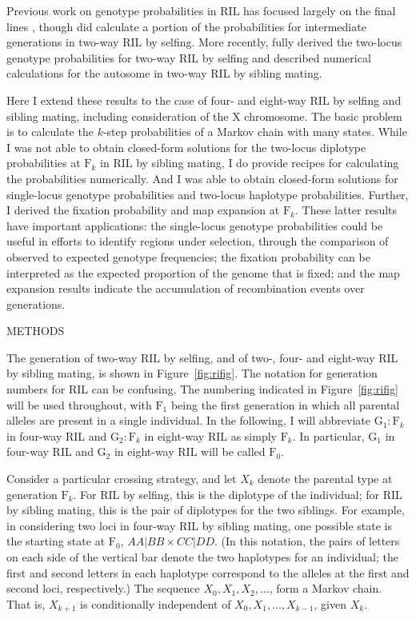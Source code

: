 \documentclass[12pt,letterpaper]{article}
\begin{document}
Previous work on genotype probabilities in RIL has focused largely on
the final lines \citep{Haldane1931, Broman2005, Teuscher2007}, though
\citet{Haldane1931} did calculate a portion of the probabilities for
intermediate generations in two-way RIL by selfing.  More recently, 
\citet{Johannes2011} fully derived the two-locus genotype
probabilities for two-way RIL by selfing and described numerical
calculations for the autosome in two-way RIL by sibling mating.

Here I extend these results to the case of four- and eight-way RIL by selfing
and sibling mating, including consideration of the X chromosome.  
The basic problem is to calculate the $k$-step probabilities of a
Markov chain with many states.  
While I was not able to obtain closed-form solutions for the
two-locus diplotype probabilities at $\text{F}_k$ in
RIL by sibling mating, I do
provide recipes for calculating the probabilities numerically.  
And I was able to obtain closed-form solutions for single-locus
genotype probabilities and two-locus haplotype probabilities.
Further, I derived the fixation probability and map expansion 
at $\text{F}_k$.  These latter results have important applications: the
single-locus genotype probabilities could be useful in efforts to
identify regions under selection, through the comparison of
observed to expected genotype frequencies; the fixation probability can be 
interpreted as the expected proportion of the genome that is fixed;
and the map expansion results indicate the accumulation of
recombination events over generations.


\clearpage
\centerline{METHODS}

The generation of two-way RIL by
selfing, and of two-, four- and eight-way RIL by sibling mating, is
shown in Figure~\ref{fig:rifig}.  The notation for generation
numbers for RIL can be confusing.  The
numbering indicated in Figure~\ref{fig:rifig} will be used throughout, with $\text{F}_1$ being
the first generation in which all parental alleles are present in a
single individual.  In the following, I will abbreviate
$\text{G}_1:\text{F}_k$ in four-way RIL and $\text{G}_2:\text{F}_k$ in
eight-way RIL as simply $\text{F}_k$.  In particular, $\text{G}_1$ in
four-way RIL and $\text{G}_2$ in eight-way RIL will be called
$\text{F}_0$.  

Consider a particular crossing strategy, and let $X_k$ denote the
parental type at generation $\text{F}_k$.  For RIL by selfing, this is
the diplotype of the individual; for RIL by sibling mating, this is
the pair of diplotypes for the two siblings.  For example, in
considering two loci in four-way RIL by sibling mating, one possible
state is the starting state at $\text{F}_0$, $AA|BB \times CC|DD$.
(In this notation, the pairs of letters
on each side of the vertical bar denote the two haplotypes for an
individual; the first and second letters in each haplotype correspond
to the alleles at the first and second loci, respectively.)  The
sequence $X_0, X_1, X_2, \dots$, form a Markov chain.  That is,
$X_{k+1}$ is conditionally independent of $X_0, X_1, \dots, X_{k-1}$,
given $X_k$.
\end{document}
